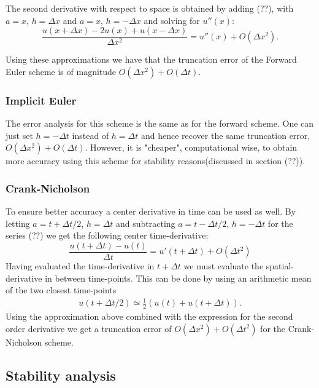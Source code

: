 \documentclass[11pt,a4paper,draft]{article}
\numberwithin{equation}{section}
\begin{document}
The second derivative with respect to space is obtained by adding (??), with $a=x$,  $h=\Delta x$ and 
$a=x$,  $h= -\Delta x$ and solving for $u''(x)$:
\begin{equation}
\frac{u(x+\Delta x)-2u(x)+u(x-\Delta x)}{\Delta x^2} = u''(x)+O(\Delta x^2).
\end{equation}  

Using these approximations we have that the truncation error of the Forward Euler scheme is of magnitude $O(\Delta x^2)+O(\Delta t)$.  

\subsubsection{Implicit Euler}
The error analysis for this scheme is the same as for the forward scheme. One can just set $h=- \Delta t$
instead of $h=\Delta t$ and hence recover the same truncation error, $O(\Delta x^2)+O(\Delta t)$. However, it is "cheaper", computational wise, to obtain more accuracy using this scheme for stability reasons(discussed in section (??)). 

\subsubsection{Crank-Nicholson}
To ensure better accuracy a center derivative in time can be used as well. By letting $a=t+\Delta t/2$, $h=\Delta t$ and subtracting $a=t-\Delta t/2$, $h=-\Delta t$ for the series (??) we get the following center time-derivative:
\begin{equation}
\frac{u(t + \Delta t)-u(t)}{\Delta t} = u'(t+\Delta t) + O(\Delta t^2)
\end{equation}
Having evaluated the time-derivative in $t+\Delta t$ we must evaluate the spatial-derivative in between time-points. This can be done by using an arithmetic mean of the two closest time-points
\begin{align*}
u(t+\Delta t/2) \simeq \frac{1}{2}(u(t)+u(t+\Delta t)).
\end{align*}
Using the approximation above combined with the expression for the second order derivative we get a truncation error of $O(\Delta x^2)+O(\Delta t^2)$ for the Crank-Nicholson scheme.

\subsection{Stability analysis}
\end{document}

